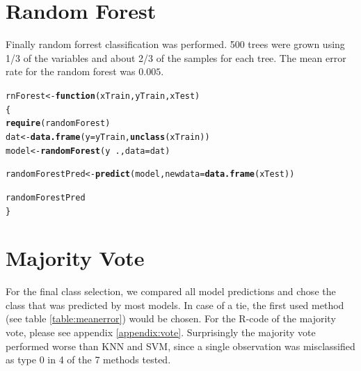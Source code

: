\documentclass[a4paper,draft=false]{scrreprt}\usepackage[]{graphicx}\usepackage[]{color}
\makeatletter
\newcommand{\hlopt}[1]{\textcolor[rgb]{0,0,0}{#1}}%
\newcommand{\hlstd}[1]{\textcolor[rgb]{0.345,0.345,0.345}{#1}}%
\newcommand{\hlkwa}[1]{\textcolor[rgb]{0.161,0.373,0.58}{\textbf{#1}}}%
\newcommand{\hlkwb}[1]{\textcolor[rgb]{0.69,0.353,0.396}{#1}}%
\newcommand{\hlkwc}[1]{\textcolor[rgb]{0.333,0.667,0.333}{#1}}%
\newcommand{\hlkwd}[1]{\textcolor[rgb]{0.737,0.353,0.396}{\textbf{#1}}}%
\newenvironment{kframe}{%
 \def\at@end@of@kframe{}%
 \ifinner\ifhmode%
  \def\at@end@of@kframe{\end{minipage}}%
  \begin{minipage}{\columnwidth}%
 \fi\fi%
 \def\FrameCommand##1{\hskip\@totalleftmargin \hskip-\fboxsep
 \colorbox{shadecolor}{##1}\hskip-\fboxsep
     \hskip-\linewidth \hskip-\@totalleftmargin \hskip\columnwidth}%
 \MakeFramed {\advance\hsize-\width
   \@totalleftmargin\z@ \linewidth\hsize
   \@setminipage}}%
 {\par\unskip\endMakeFramed%
 \at@end@of@kframe}
\newenvironment{knitrout}{}{} %
\makeatother
\begin{document}
\section{Random Forest} %
Finally random forrest classification was performed. 500 trees were grown using 1/3 of the variables and about 2/3 of the samples for each tree. The mean error rate for the random forest was $0.005$.
\begin{knitrout}
\color{fgcolor}\begin{kframe}
\begin{alltt}
\hlstd{rnForest} \hlkwb{<-} \hlkwa{function}\hlstd{(}\hlkwc{xTrain}\hlstd{,} \hlkwc{yTrain}\hlstd{,} \hlkwc{xTest}\hlstd{)}
\hlstd{\{}
  \hlkwd{require}\hlstd{(randomForest)}
  \hlstd{dat} \hlkwb{<-} \hlkwd{data.frame}\hlstd{(}\hlkwc{y} \hlstd{= yTrain,} \hlkwd{unclass}\hlstd{(xTrain))}
  \hlstd{model} \hlkwb{<-} \hlkwd{randomForest}\hlstd{(y} \hlopt{~} \hlstd{.,} \hlkwc{data} \hlstd{= dat)}

  \hlstd{randomForestPred} \hlkwb{<-} \hlkwd{predict}\hlstd{(model,} \hlkwc{newdata} \hlstd{=} \hlkwd{data.frame}\hlstd{(xTest))}

  \hlstd{randomForestPred}
\hlstd{\}}
\end{alltt}
\end{kframe}
\end{knitrout}


\section{Majority Vote} %
For the final class selection, we compared all model predictions and chose the class that was predicted by most models. In case of a tie, the first used method (see table \ref{table:meanerror}) would be chosen. For the R-code of the majority vote, please see appendix \ref{appendix:vote}. Surprisingly the majority vote performed worse than KNN and SVM, since a single observation was misclassified as type 0 in 4 of the 7 methods tested.
\end{document}
